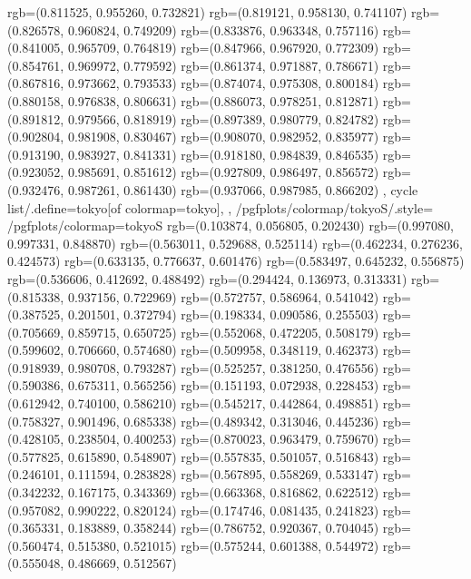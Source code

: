 {{{					rgb=(0.811525, 0.955260, 0.732821)
					rgb=(0.819121, 0.958130, 0.741107)
					rgb=(0.826578, 0.960824, 0.749209)
					rgb=(0.833876, 0.963348, 0.757116)
					rgb=(0.841005, 0.965709, 0.764819)
					rgb=(0.847966, 0.967920, 0.772309)
					rgb=(0.854761, 0.969972, 0.779592)
					rgb=(0.861374, 0.971887, 0.786671)
					rgb=(0.867816, 0.973662, 0.793533)
					rgb=(0.874074, 0.975308, 0.800184)
					rgb=(0.880158, 0.976838, 0.806631)
					rgb=(0.886073, 0.978251, 0.812871)
					rgb=(0.891812, 0.979566, 0.818919)
					rgb=(0.897389, 0.980779, 0.824782)
					rgb=(0.902804, 0.981908, 0.830467)
					rgb=(0.908070, 0.982952, 0.835977)
					rgb=(0.913190, 0.983927, 0.841331)
					rgb=(0.918180, 0.984839, 0.846535)
					rgb=(0.923052, 0.985691, 0.851612)
					rgb=(0.927809, 0.986497, 0.856572)
					rgb=(0.932476, 0.987261, 0.861430)
					rgb=(0.937066, 0.987985, 0.866202)
			},
		cycle list/.define={tokyo}{[of colormap=tokyo]},
		},
		/pgfplots/colormap/tokyoS/.style={
			/pgfplots/colormap={tokyoS}{%
					rgb=(0.103874, 0.056805, 0.202430)
					rgb=(0.997080, 0.997331, 0.848870)
					rgb=(0.563011, 0.529688, 0.525114)
					rgb=(0.462234, 0.276236, 0.424573)
					rgb=(0.633135, 0.776637, 0.601476)
					rgb=(0.583497, 0.645232, 0.556875)
					rgb=(0.536606, 0.412692, 0.488492)
					rgb=(0.294424, 0.136973, 0.313331)
					rgb=(0.815338, 0.937156, 0.722969)
					rgb=(0.572757, 0.586964, 0.541042)
					rgb=(0.387525, 0.201501, 0.372794)
					rgb=(0.198334, 0.090586, 0.255503)
					rgb=(0.705669, 0.859715, 0.650725)
					rgb=(0.552068, 0.472205, 0.508179)
					rgb=(0.599602, 0.706660, 0.574680)
					rgb=(0.509958, 0.348119, 0.462373)
					rgb=(0.918939, 0.980708, 0.793287)
					rgb=(0.525257, 0.381250, 0.476556)
					rgb=(0.590386, 0.675311, 0.565256)
					rgb=(0.151193, 0.072938, 0.228453)
					rgb=(0.612942, 0.740100, 0.586210)
					rgb=(0.545217, 0.442864, 0.498851)
					rgb=(0.758327, 0.901496, 0.685338)
					rgb=(0.489342, 0.313046, 0.445236)
					rgb=(0.428105, 0.238504, 0.400253)
					rgb=(0.870023, 0.963479, 0.759670)
					rgb=(0.577825, 0.615890, 0.548907)
					rgb=(0.557835, 0.501057, 0.516843)
					rgb=(0.246101, 0.111594, 0.283828)
					rgb=(0.567895, 0.558269, 0.533147)
					rgb=(0.342232, 0.167175, 0.343369)
					rgb=(0.663368, 0.816862, 0.622512)
					rgb=(0.957082, 0.990222, 0.820124)
					rgb=(0.174746, 0.081435, 0.241823)
					rgb=(0.365331, 0.183889, 0.358244)
					rgb=(0.786752, 0.920367, 0.704045)
					rgb=(0.560474, 0.515380, 0.521015)
					rgb=(0.575244, 0.601388, 0.544972)
					rgb=(0.555048, 0.486669, 0.512567)
}}}

